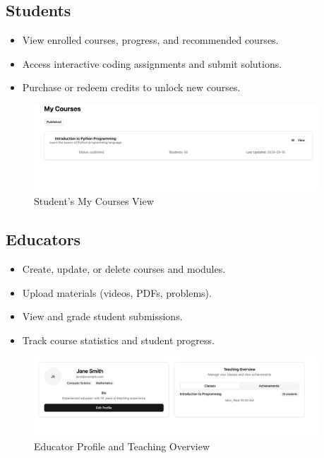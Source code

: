 \documentclass[a4paper,11pt]{scrartcl}
\begin{document}
\subsection{Students}
\begin{itemize}[leftmargin=*]
    \item View enrolled courses, progress, and recommended courses.
    \item Access interactive coding assignments and submit solutions.
    \item Purchase or redeem credits to unlock new courses.
\end{itemize}
\begin{figure}[H]
    \centering
    \includegraphics[width=0.95\textwidth]{myCourse.jpg}
    \caption{Student's My Courses View}
\end{figure}

\subsection{Educators}
\begin{itemize}[leftmargin=*]
    \item Create, update, or delete courses and modules.
    \item Upload materials (videos, PDFs, problems).
    \item View and grade student submissions.
    \item Track course statistics and student progress.
\end{itemize}
\begin{figure}[H]
    \centering
    \includegraphics[width=0.95\textwidth]{TeacherProfile.jpg}
    \caption{Educator Profile and Teaching Overview}
\end{figure}
\end{document}
